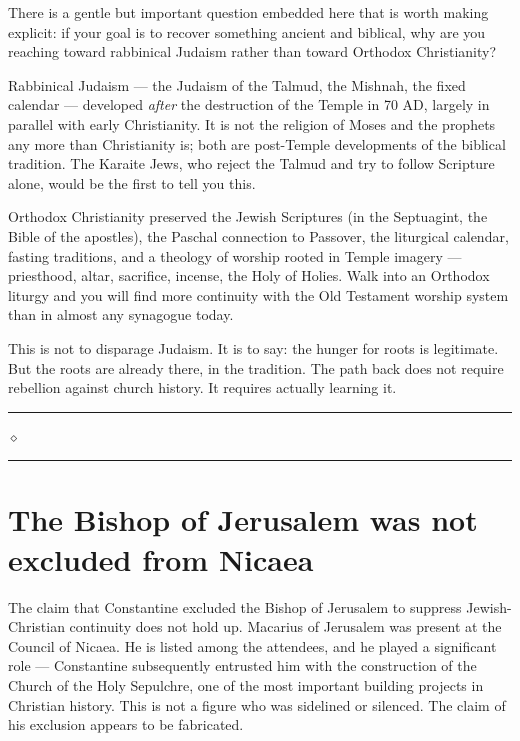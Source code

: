 \documentclass[10pt,twoside,openany]{book}
\newcommand{\ornrule}{%
  \par\bigskip
  {\noindent\hfil{\color{gold}\rule[0.5ex]{1.5in}{0.5pt}%
  \quad$\diamond$\quad%
  \rule[0.5ex]{1.5in}{0.5pt}}\hfil\par}%
  \bigskip
}
\begin{document}
\begin{westernbox}
There is a gentle but important question embedded here
that is worth making explicit: if your goal is to
recover something ancient and biblical, why are you
reaching toward rabbinical Judaism rather than toward
Orthodox Christianity?

Rabbinical Judaism --- the Judaism of the Talmud, the
Mishnah, the fixed calendar --- developed \emph{after} the
destruction of the Temple in 70 AD, largely in parallel
with early Christianity. It is not the religion of
Moses and the prophets any more than Christianity is;
both are post-Temple developments of the biblical
tradition. The Karaite Jews, who reject the Talmud and
try to follow Scripture alone, would be the first to
tell you this.

Orthodox Christianity preserved the Jewish Scriptures
(in the Septuagint, the Bible of the apostles), the
Paschal connection to Passover, the liturgical calendar,
fasting traditions, and a theology of worship rooted in
Temple imagery --- priesthood, altar, sacrifice, incense,
the Holy of Holies. Walk into an Orthodox liturgy and
you will find more continuity with the Old Testament
worship system than in almost any synagogue today.

This is not to disparage Judaism. It is to say: the
hunger for roots is legitimate. But the roots are
already there, in the tradition. The path back does not
require rebellion against church history. It requires
actually learning it.
\end{westernbox}

\ornrule



\section{The Bishop of Jerusalem was not excluded from Nicaea}

The claim that Constantine excluded the Bishop of Jerusalem to
suppress Jewish-Christian continuity does not hold up. Macarius of
Jerusalem was present at the Council of Nicaea. He is listed among
the attendees, and he played a significant role --- Constantine
subsequently entrusted him with the construction of the Church of the
Holy Sepulchre, one of the most important building projects in
Christian history. This is not a figure who was sidelined or silenced.
The claim of his exclusion appears to be fabricated.
\end{document}
